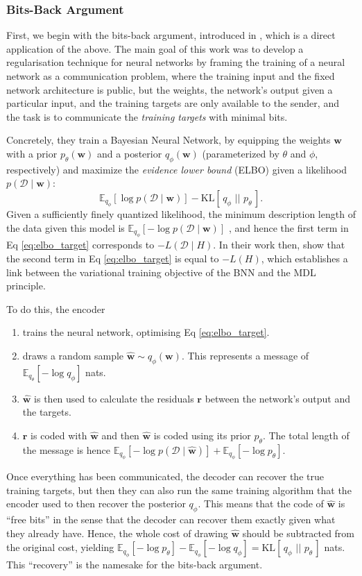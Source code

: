 \documentclass{article}
\renewcommand{\vec}[1]{\mathbf{#1}}
\newcommand{\KL}[2]{\mathrm{KL}[\,#1\,\,||\,\,#2\,]}
\newcommand{\Exp}{\mathbb{E}}
\newcommand{\Data}{\mathcal{D}}
\begin{document}
\subsubsection{Bits-Back Argument}
First, we begin with the bits-back argument, introduced in
\cite{hinton1993keeping}, which is a direct application of the above. The main
goal of this work was to develop a regularisation technique for neural networks
by framing the training of a neural network as a communication problem, where
the training input and the fixed network architecture is public, but the weights,
the network's output given a particular input, and the training targets are
only available to the sender, and the task is to communicate the
\textit{training targets} with minimal bits.
\par
Concretely, they train a Bayesian Neural Network, by equipping the weights
$\vec{w}$ with a prior $p_\theta(\vec{w})$ and a posterior $q_\phi(\vec{w})$
(parameterized by $\theta$ and $\phi$, respectively) and maximize
the \textit{evidence lower bound} (ELBO) given a likelihood $p(\Data \mid \vec{w})$:
\begin{equation}
  \label{eq:elbo_target}
  \Exp_{q_\phi}[\log p(\Data \mid \vec{w})] - \KL{q_{\phi}}{p_{\theta}}.
\end{equation}
Given a sufficiently finely quantized likelihood, the minimum description length
of the data given this model is $\Exp_{q_\phi}[-\log p(\Data \mid \vec{w})]$
\cite{shannon1998mathematical}, and hence the first term in Eq
\ref{eq:elbo_target} corresponds to $-L(\Data \mid H)$. In their work then,
\cite{hinton1993keeping} show that the second term in Eq \ref{eq:elbo_target}
is equal to $-L(H)$, which establishes a link between the variational training
objective of the BNN and the MDL principle.
\par
To do this, the encoder
\begin{enumerate}
\item trains the neural network, optimising Eq \ref{eq:elbo_target}.
\item draws a random sample $\vec{\hat{w}} \sim q_{\phi}(\vec{w})$. This
  represents a message of $\Exp_{q_\theta}[- \log q_\phi]$ nats.
\item $\vec{\hat{w}}$ is then used to calculate the residuals $\vec{r}$ between
  the network's output and the targets.
\item $\vec{r}$ is coded with $\vec{\hat{w}}$ and then $\vec{\hat{w}}$ is coded
  using its prior $p_\theta$. The total length of the message is hence $\Exp_{q_\phi}[-\log
  p(\Data \mid \vec{\hat{w}})] + \Exp_{q_\phi}[-\log p_{\theta}]$.
\end{enumerate}
Once everything has been communicated, the decoder can recover the true training
targets, but then they can also run the same training algorithm that the encoder
used to then recover the posterior $q_\phi$. This means that the code of
$\vec{\hat{w}}$ is ``free bits'' in the sense that the decoder can recover them
exactly given what they already have. 
Hence, the whole cost of drawing $\vec{\hat{w}}$ should be
subtracted from the original cost, yielding
$\Exp_{q_\phi}[-\log p_{\theta}] - \Exp_{q_\phi}[-\log q_{\phi}] =
\KL{q_{\phi}}{p_\theta}$ nats. This ``recovery'' is the namesake for the
bits-back argument.
\end{document}
